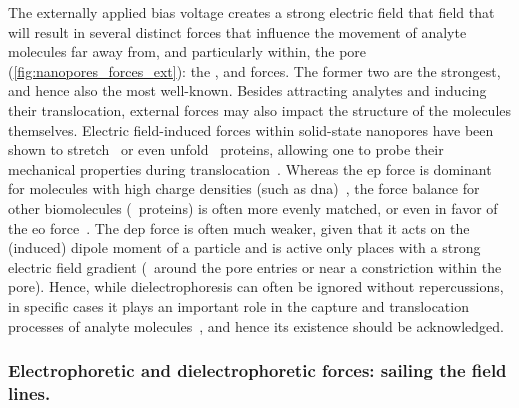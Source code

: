 The externally applied bias voltage creates a strong electric field that field that will result in several
distinct forces that influence the movement of analyte molecules far away from, and particularly within, the
pore (\cref{fig:nanopores_forces_ext}): the ,
 and  forces. The former two are the
strongest, and hence also the most well-known. Besides attracting analytes and inducing their translocation,
external forces may also impact the structure of the molecules themselves. Electric field-induced forces
within solid-state nanopores have been shown to stretch~\cite{Freedman-2013} or even
unfold~\cite{Freedman-2011} proteins, allowing one to probe their mechanical properties during
translocation~\cite{Waduge-2017,Zhou-2020b}. Whereas the \gls{ep} force is dominant for molecules with high
charge densities (such as \gls{dna})~\cite{vanDorp-2009}, the force balance for other biomolecules
(\eg~proteins) is often more evenly matched, or even in favor of the \gls{eo}
force~\cite{Soskine-2013,Zhang-2020}. The \gls{dep} force is often much weaker, given that it acts on the
(induced) dipole moment of a particle and is active only places with a strong electric field gradient
(\ie~around the pore entries or near a constriction within the pore). Hence, while dielectrophoresis can often
be ignored without repercussions, in specific cases it plays an important role in the capture and
translocation processes of analyte molecules~\cite{Freedman-2016,Asandei-2016}, and hence its existence should
be acknowledged.


\subsubsection{Electrophoretic and dielectrophoretic forces: sailing the field lines.}
%

